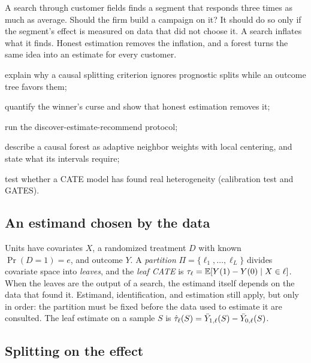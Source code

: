 \documentclass[11pt]{article}
\begin{document}

\begin{decision}
A search through customer fields finds a segment that responds three times as much as average. Should the
firm build a campaign on it? It should do so only if the segment's effect is measured on data that did not
choose it. A search inflates what it finds. Honest estimation removes the inflation, and a forest turns the same
idea into an estimate for every customer.
\end{decision}

\begin{goals}
  \item explain why a causal splitting criterion ignores prognostic splits while an outcome tree favors them;
  \item quantify the winner's curse and show that honest estimation removes it;
  \item run the discover-estimate-recommend protocol;
  \item describe a causal forest as adaptive neighbor weights with local centering, and state what its
  intervals require;
  \item test whether a CATE model has found real heterogeneity (calibration test and GATES).
\end{goals}

\sectionone

\subsection{An estimand chosen by the data}

Units have covariates $X$, a randomized treatment $D$ with known $\Pr(D=1) = e$, and outcome $Y$. A
\emph{partition} $\Pi = \{\ell_1, \dots, \ell_L\}$ divides covariate space into \emph{leaves}, and the
\emph{leaf CATE} is $\tau_\ell = \mathbb{E}[Y(1) - Y(0) \mid X \in \ell]$. When the leaves are the output of a search, the
estimand itself depends on the data that found it. Estimand, identification, and estimation still apply, but
only in order: the partition must be fixed before the data used to estimate it are consulted. The leaf
estimate on a sample $S$ is $\hat{\tau}_\ell(S) = \bar Y_{1,\ell}(S) - \bar Y_{0,\ell}(S)$.

\subsection{Splitting on the effect}
\end{document}
